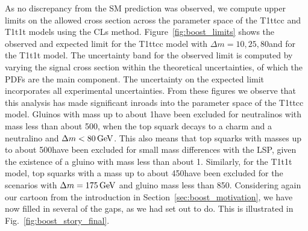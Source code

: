 
As no discrepancy from the SM prediction was observed, we compute upper limits on the allowed
cross section across the parameter space of the T1ttcc and T1t1t models using the CLs method.
Figure~\ref{fig:boost_limits} shows the observed and expected limit for the T1ttcc model with
$\Delta m=10,25,80$\GeV and for the T1t1t model. 
The uncertainty band for the observed limit is computed by varying the signal cross section within
the theoretical uncertainties, of which the PDFs are the main component. The uncertainty on the
expected limit incorporates all experimental uncertainties. 
From these figures we observe that this analysis has made significant inroads into the parameter
space of the T1ttcc model. 
Gluinos with mass up to about 1\TeV have been excluded for neutralinos with mass less than about
500\GeV, when the top squark decays to a charm and a neutralino and $\Delta m < 80\,\text{Ge\hspace{-.08em}V}$. This also
means that top squarks with masses up to about 500\GeV have been excluded for small mass
differences with the LSP, given the existence of a gluino with mass less than about 1\TeV. 
Similarly, for the T1t1t model, top squarks with a mass up to about 450\GeV have been excluded
for the scenarios with $\Delta m = 175\,\text{Ge\hspace{-.08em}V}$ and gluino mass less than 850\GeV.
Considering again our cartoon from the introduction in Section~\ref{sec:boost_motivation}, we have
now filled in several of the gaps, as we had set out to do. This is illustrated in
Fig.~\ref{fig:boost_story_final}. 

